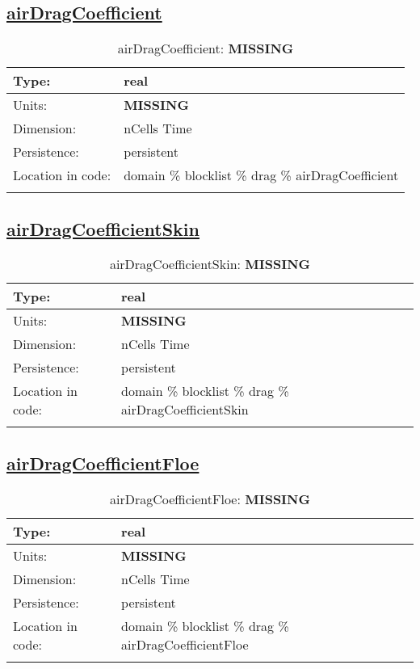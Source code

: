 \subsection[airDragCoefficient]{\hyperref[sec:var_tab_drag]{airDragCoefficient}}
\label{subsec:var_sec_drag_airDragCoefficient}
\begin{center}
\begin{longtable}{| p{2.0in} | p{4.0in} |}
        \hline 
        Type: & real \\
        \hline 
        Units: & {\bf \color{red} MISSING} \\
        \hline 
        Dimension: & nCells Time \\
        \hline 
        Persistence: & persistent \\
        \hline 
         Location in code: & domain \% blocklist \% drag \% airDragCoefficient \\
         \hline 
    \caption{airDragCoefficient: {\bf \color{red} MISSING}}
\end{longtable}
\end{center}
\subsection[airDragCoefficientSkin]{\hyperref[sec:var_tab_drag]{airDragCoefficientSkin}}
\label{subsec:var_sec_drag_airDragCoefficientSkin}
\begin{center}
\begin{longtable}{| p{2.0in} | p{4.0in} |}
        \hline 
        Type: & real \\
        \hline 
        Units: & {\bf \color{red} MISSING} \\
        \hline 
        Dimension: & nCells Time \\
        \hline 
        Persistence: & persistent \\
        \hline 
         Location in code: & domain \% blocklist \% drag \% airDragCoefficientSkin \\
         \hline 
    \caption{airDragCoefficientSkin: {\bf \color{red} MISSING}}
\end{longtable}
\end{center}
\subsection[airDragCoefficientFloe]{\hyperref[sec:var_tab_drag]{airDragCoefficientFloe}}
\label{subsec:var_sec_drag_airDragCoefficientFloe}
\begin{center}
\begin{longtable}{| p{2.0in} | p{4.0in} |}
        \hline 
        Type: & real \\
        \hline 
        Units: & {\bf \color{red} MISSING} \\
        \hline 
        Dimension: & nCells Time \\
        \hline 
        Persistence: & persistent \\
        \hline 
         Location in code: & domain \% blocklist \% drag \% airDragCoefficientFloe \\
         \hline 
    \caption{airDragCoefficientFloe: {\bf \color{red} MISSING}}
\end{longtable}
\end{center}
